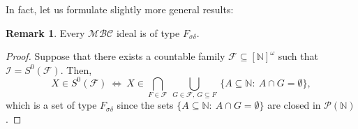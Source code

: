 \documentclass{amsart}
\theoremstyle{definition}
\newtheorem{remark}[thm]{Remark}
\theoremstyle{definition}
\newcommand{\N}{{\mathbb N}}
\newcommand{\I}{\mathcal I}
\newcommand{\InfSubs}{[\N]^{\omega}}
\newcommand{\MB}{S^0}  %
\newcommand{\MBC}{\mathcal{MBC}}
\begin{document}
In fact, let us formulate slightly more general results:
\begin{remark}
Every $\MBC$ ideal is of type $F_{\sigma\delta}$.
\end{remark}
\begin{proof}
Suppose that there exists a countable family $\mathcal{F}\subseteq \InfSubs$ such that $\I = \MB(\mathcal{F})$. Then,
$$X\in \MB(\mathcal{F})\ \Longleftrightarrow\ X\in \bigcap_{F\in\mathcal{F}}\ \bigcup_{G\in\mathcal{F},\ G\subseteq F}\ \{A\subseteq\N :\ A\cap G=\emptyset\},$$
which is a set of type $F_{\sigma\delta}$ since the sets $\{A\subseteq\N :\ A\cap G=\emptyset\}$ are closed in $\mathcal{P}(\N)$.
\end{proof}
\end{document}
